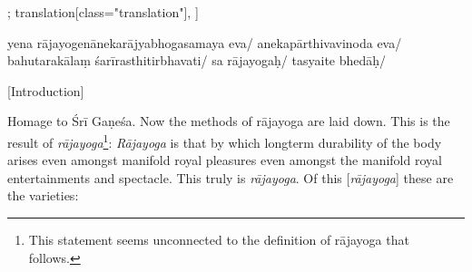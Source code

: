 \documentclass[12pt]{article}%
\begin{document}
\begin{alignment}[
    texts=edition[class="edition"];
    translation[class="translation"],
    ]
\begin{edition}
\begin{prose}
      yena rājayogenānekarājyabhogasamaya eva/ anekapārthivavinoda
      eva/ bahutarakālaṃ śarīrasthitirbhavati/ sa
      rājayogaḥ/ \bigskip
       tasyaite bhedāḥ/
     \end{prose}
     \end{edition}
      \begin{translation}
    \centerline{\textrm{\small{[Introduction]}}}
    \bigskip
    \begin{tlate}Homage to Śrī Gaṇeśa. Now the methods of rājayoga are laid down. This is the result of \textit{rājayoga}\footnote{This statement seems unconnected to the definition of rājayoga that follows.}: \textit{Rājayoga} is that by which longterm durability of the body arises even amongst manifold royal pleasures even amongst the manifold royal entertainments and spectacle. This truly is \textit{rājayoga}. Of this [\textit{rājayoga}] these are the varieties: \end{tlate}
      \bigskip
       \end{translation}
        

\end{alignment}
\end{document}
